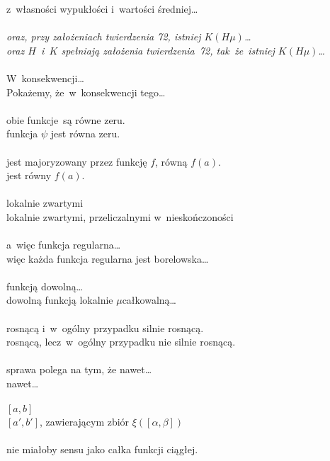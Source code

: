 \documentclass[a4paper,11pt]{article}
\begin{document}
\Powin  z~własności wypukłości i~wartości średniej\ldots \\
 \\
\Jest \textit{oraz, przy założeniach twierdzenia 72, istniej
  $K( H \mu )$\ldots} \\
\Powin \textit{oraz $H$~i~$K$ spełniają założenia twierdzenia~72,
  tak~że~istniej $K( H \mu )$\ldots}\\
 \\
\Jest  W~konsekwencji\ldots \\
\Powin Pokażemy, że~w~konsekwencji tego\ldots \\
 \\
\Jest  obie funkcje~są równe zeru. \\
\Powin funkcja $\psi$ jest równa zeru. \\
 \\
\Jest jest majoryzowany przez funkcję $f$, równą $f( a )$. \\
\Powin  jest równy $f( a )$.\\
 \\
\Jest lokalnie zwartymi \\
\Powin  lokalnie zwartymi, przeliczalnymi w~nieskończoności \\
 \\
\Jest a~więc funkcja regularna\ldots \\
\Powin  więc każda funkcja regularna jest borelowska\ldots \\
 \\
\Jest funkcją dowolną\ldots \\
\Powin  dowolną funkcją lokalnie $\mu$\dywiz całkowalną\ldots \\
 \\
\Jest rosnącą i~w~ogólny przypadku silnie rosnącą. \\
\Powin  rosnącą, lecz~w~ogólny przypadku nie silnie rosnącą. \\
 \\
\Jest sprawa polega na tym, że nawet\ldots \\
\Powin  nawet\ldots \\
 \\
\Jest $[ a, b ]$ \\
\Powin  $[ a', b' ]$, zawierającym zbiór $\xi( [ \alpha, \beta ] )$ \\
 \\
\Jest nie miałoby sensu jako całka funkcji ciągłej. \\
\end{document}
